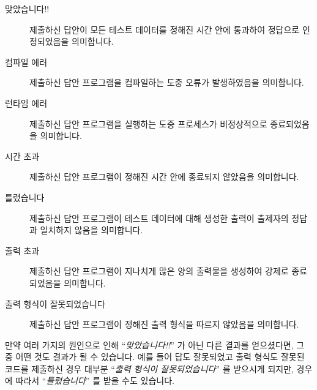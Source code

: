 \begin{description}
\item[맞았습니다!!] 제출하신 답안이 모든 테스트 데이터를 정해진 시간 안에 통과하여 정답으로 인정되었음을 의미합니다.
\item[컴파일 에러] 제출하신 답안 프로그램을 컴파일하는 도중 오류가 발생하였음을 의미합니다.
\item[런타임 에러] 제출하신 답안 프로그램을 실행하는 도중 프로세스가 비정상적으로 종료되었음을 의미합니다.
\item[시간 초과] 제출하신 답안 프로그램이 정해진 시간 안에 종료되지 않았음을 의미합니다.
\item[틀렸습니다] 제출하신 답안 프로그램이 테스트 데이터에 대해 생성한 출력이 출제자의 정답과 일치하지 않음을 의미합니다.
\item[출력 초과] 제출하신 답안 프로그램이 지나치게 많은 양의 출력물을 생성하여 강제로 종료되었음을 의미합니다.
\item[출력 형식이 잘못되었습니다] 제출하신 답안 프로그램이 정해진 출력 형식을 따르지 않았음을 의미합니다.
\end{description}

만약 여러 가지의 원인으로 인해 ``\emph{맞았습니다!!}'' 가 아닌 다른 결과를 얻으셨다면, 그 중 어떤 것도 결과가 될 수 있습니다.
예를 들어 답도 잘못되었고 출력 형식도 잘못된 코드를 제출하신 경우 대부분 ``\emph{출력 형식이 잘못되었습니다}'' 를 받으시게 되지만, 경우에 따라서 ``\emph{틀렸습니다}'' 를 받을 수도 있습니다.

\clearpage
